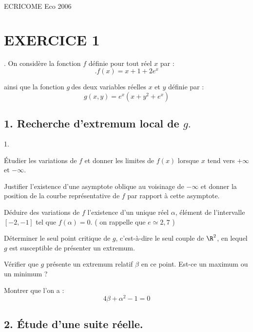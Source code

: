 \documentclass[11pt]{article}%
\begin{document}
\begin{center}
{\Huge ECRICOME Eco 2006}
\end{center}

\section*{EXERCICE 1}. On considère la fonction $f$ définie pour tout
réel $x$ par : 
\[.f\left( x\right) = x + 1 + 2e^{x}
\]

ainsi que la fonction $g\ $des deux variables réelles $x$ et $y$
définie par : 
\[
g\left( x,y\right) = e^{x}\left( x + y^{2} + e^{x}\right)
\]

\subsection*{1. Recherche d'extremum local de $g.$}

\begin{noliste}{1.}
 \setlength{\itemsep}{4mm}
\item Étudier les variations de $f$ et donner les limites de $f\left(
x\right) $ lorsque $x$ tend vers $ + \infty $ et $-\infty $.

\item Justifier l'existence d'une asymptote oblique au voisinage de
$-\infty 
$ et donner la position de la courbe représentative de $f$ par rapport
à
cette asymptote.

\item Déduire des variations de $f$ l'existence d'un unique réel
$\alpha $, élément de l'intervalle $\left[ -2,-1\right] $ tel que
$f\left( \alpha \right) = 0$. ( on rappelle que $e\simeq 2,7$ )

\item Déterminer le seul point critique de $g$, c'est-à-dire le seul
couple
de $\R^{2}$, en lequel $g$ est susceptible de présenter un extremum.

\item Vérifier que $g$ présente un extremum relatif $\beta $ en ce
point.
Est-ce un maximum ou un minimum ?

\item Montrer que l'on a : 
\[
4\beta + \alpha ^{2}-1 = 0
\]
\end{noliste}

\subsection*{2. Étude d'une suite réelle.}
\end{document}
